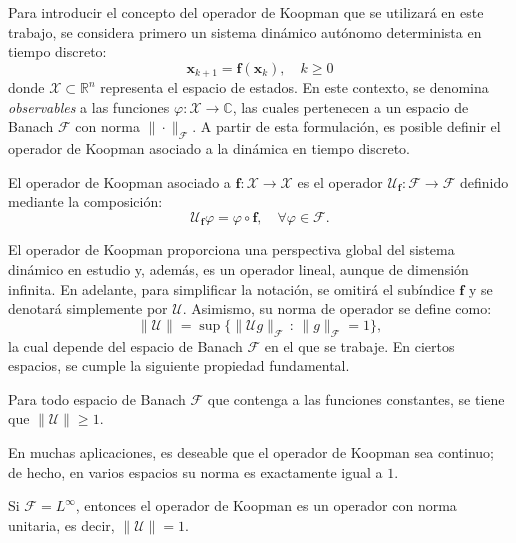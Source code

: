 Para introducir el concepto del operador de Koopman que se utilizará en este trabajo, se considera primero un sistema dinámico autónomo determinista en tiempo discreto:  
\begin{equation}
	\mathbf{x}_{k+1} = \mathbf{f}(\mathbf{x}_k), \quad k \geq 0
	\label{eq:NL}
	\tag{NL}
\end{equation}
donde $\mathcal{X} \subset \mathbb{R}^n$ representa el espacio de estados. En este contexto, se denomina \textit{observables} a las funciones $\varphi: \mathcal{X} \to \mathbb{C}$, las cuales pertenecen a un espacio de Banach $\mathcal{F}$ con norma $\|\cdot\|_{\mathcal{F}}$. A partir de esta formulación, es posible definir el operador de Koopman asociado a la dinámica en tiempo discreto.  

\begin{defn}
    El operador de Koopman asociado a $\mathbf{f}: \mathcal{X} \to \mathcal{X}$ es el operador $\mathcal{U}_{\mathbf{f}}: \mathcal{F} \to \mathcal{F}$ definido mediante la composición:
    \begin{equation*}
        \mathcal{U}_{\mathbf{f}} \varphi = \varphi \circ \mathbf{f}, \quad \forall \varphi \in \mathcal{F}.
    \end{equation*}
\end{defn}

\noindent El operador de Koopman proporciona una perspectiva global del sistema dinámico en estudio y, además, es un operador lineal, aunque de dimensión infinita.  
En adelante, para simplificar la notación, se omitirá el subíndice $\mathbf{f}$ y se denotará simplemente por $\mathcal{U}$. Asimismo, su norma de operador se define como:
\begin{equation*}
    \|\mathcal{U}\| = \sup \{ \|\mathcal{U} g\|_{\mathcal{F}} \, : \, \|g\|_{\mathcal{F}} = 1 \},
\end{equation*}
la cual depende del espacio de Banach $\mathcal{F}$ en el que se trabaje. En ciertos espacios, se cumple la siguiente propiedad fundamental.

\begin{prop}
    Para todo espacio de Banach $\mathcal{F}$ que contenga a las funciones constantes, se tiene que $\|\mathcal{U}\| \geq 1$.
\end{prop}

En muchas aplicaciones, es deseable que el operador de Koopman sea continuo; de hecho, en varios espacios su norma es exactamente igual a $1$.

\begin{prop}
    Si $\mathcal{F} = L^\infty$, entonces el operador de Koopman es un operador con norma unitaria, es decir, $\|\mathcal{U}\| = 1$.
\end{prop}

